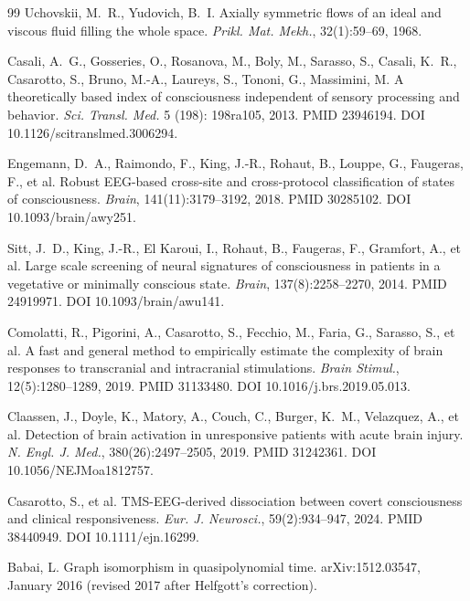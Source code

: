 \documentclass[11pt,a4paper]{amsart}
\theoremstyle{plain}
\theoremstyle{definition}
\begin{document}
\begin{thebibliography}{99}
Uchovskii, M.~R., Yudovich, B.~I.
\newblock Axially symmetric flows of an ideal and viscous fluid filling the whole space.
\newblock \emph{Prikl. Mat. Mekh.}, 32(1):59--69, 1968.

Casali, A.~G., Gosseries, O., Rosanova, M., Boly, M., Sarasso, S., Casali, K.~R., Casarotto, S., Bruno, M.-A., Laureys, S., Tononi, G., Massimini, M.
\newblock A theoretically based index of consciousness independent of sensory processing and behavior.
\newblock \emph{Sci. Transl. Med.} 5 (198): 198ra105, 2013. PMID 23946194. DOI 10.1126/scitranslmed.3006294.

Engemann, D.~A., Raimondo, F., King, J.-R., Rohaut, B., Louppe, G., Faugeras, F., et al.
\newblock Robust EEG-based cross-site and cross-protocol classification of states of consciousness.
\newblock \emph{Brain}, 141(11):3179--3192, 2018. PMID 30285102. DOI 10.1093/brain/awy251.

Sitt, J.~D., King, J.-R., El Karoui, I., Rohaut, B., Faugeras, F., Gramfort, A., et al.
\newblock Large scale screening of neural signatures of consciousness in patients in a vegetative or minimally conscious state.
\newblock \emph{Brain}, 137(8):2258--2270, 2014. PMID 24919971. DOI 10.1093/brain/awu141.

Comolatti, R., Pigorini, A., Casarotto, S., Fecchio, M., Faria, G., Sarasso, S., et al.
\newblock A fast and general method to empirically estimate the complexity of brain responses to transcranial and intracranial stimulations.
\newblock \emph{Brain Stimul.}, 12(5):1280--1289, 2019. PMID 31133480. DOI 10.1016/j.brs.2019.05.013.

Claassen, J., Doyle, K., Matory, A., Couch, C., Burger, K.~M., Velazquez, A., et al.
\newblock Detection of brain activation in unresponsive patients with acute brain injury.
\newblock \emph{N. Engl. J. Med.}, 380(26):2497--2505, 2019. PMID 31242361. DOI 10.1056/NEJMoa1812757.

Casarotto, S., et al.
\newblock TMS-EEG-derived dissociation between covert consciousness and clinical responsiveness.
\newblock \emph{Eur. J. Neurosci.}, 59(2):934--947, 2024. PMID 38440949. DOI 10.1111/ejn.16299.

Babai, L.
\newblock Graph isomorphism in quasipolynomial time.
\newblock arXiv:1512.03547, January 2016 (revised 2017 after Helfgott's correction).


\end{thebibliography}
\end{document}
